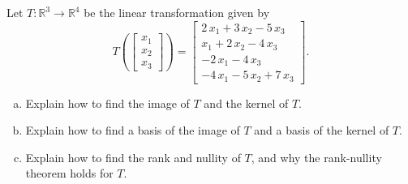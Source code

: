 
\begin{exerciseStatement}
 Let \(T:\mathbb{R}^ 3  \to \mathbb{R}^ 4 \) be the linear transformation given by \[T\left(  \left[\begin{array}{c}
x_{1} \\
x_{2} \\
x_{3}
\end{array}\right]  \right) =  \left[\begin{array}{c}
2 \, x_{1} + 3 \, x_{2} - 5 \, x_{3} \\
x_{1} + 2 \, x_{2} - 4 \, x_{3} \\
-2 \, x_{1} - 4 \, x_{3} \\
-4 \, x_{1} - 5 \, x_{2} + 7 \, x_{3}
\end{array}\right] .\]
\begin{enumerate}[(a)]
\item Explain how to find the image of \(T\) and the kernel of \(T\).
\item Explain how to find a basis of the image of \(T\) and a basis of the kernel of \(T\).
\item Explain how to find the rank and nullity of \(T\), and why the rank-nullity theorem holds for \(T\).
\end{enumerate}
    
\end{exerciseStatement}
    
